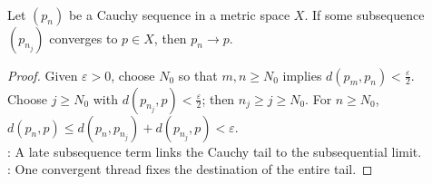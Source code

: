 \begin{lemma} \label{lem:cauchy-sequence-with-convergent-subsequence} \\
Let $(p_n)$ be a Cauchy sequence in a metric space $X$. If some subsequence $(p_{n_j})$ converges to $p\in X$, then $p_n\to p$.
\begin{proof}
Given $\varepsilon>0$, choose $N_0$ so that $m,n\geq N_0$ implies $d(p_m,p_n)<\frac{\varepsilon}{2}$.\\
Choose $j\geq N_0$ with $d(p_{n_j},p)<\frac{\varepsilon}{2}$; then $n_j\geq j\geq N_0$. For $n\geq N_0$, $d(p_n,p)\leq d(p_n,p_{n_j})+d(p_{n_j},p)<\varepsilon$.\\
: A late subsequence term links the Cauchy tail to the subsequential limit.\\
: One convergent thread fixes the destination of the entire tail.
\end{proof}
\end{lemma}

